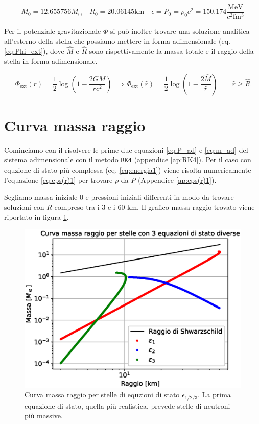 \documentclass[a4paper, titlepage]{article}
\newcommand{\Punit}[0]{\frac{\unit{\mega\electronvolt}}{c^2 \unit{\femto\cubic\meter}}}
\begin{document}
\begin{equation}
    M_0 = 12.655756 M_\odot \quad R_0 = 20.06145 \unit{\kilo\meter} \quad \epsilon = P_0 = \rho_0 c^2 = 150.174 \Punit
    \label{eq:val_cost}
\end{equation}

Per il potenziale gravitazionale $\Phi$ si può inoltre trovare una soluzione analitica all'esterno della stella che possiamo mettere in forma adimensionale (eq. \ref{eq:Phi_ext}), dove $\hat{M}$ e $\hat R$ sono rispettivamente la massa totale e il raggio della stella in forma adimensionale.

\begin{equation}
    \Phi_\text{ext} (r) = \frac{1}{2} \log(1 - \frac{2 G M}{r c^2})
    \implies \Phi_\text{ext} (\hat r) = \frac{1}{2} \log(1 - \frac{2 \hat{M}}{\hat r}) \quad \quad \hat r \geq \hat{R}
    \label{eq:Phi_ext}
\end{equation}


\section{Curva massa raggio}
Cominciamo con il risolvere le prime due equazioni \ref{eq:P_ad} e \ref{eq:m_ad} del sistema adimensionale con il metodo \texttt{RK4} (appendice \ref{ap:RK4}).
Per il caso con equzione di stato più complessa (eq. \ref{eq:energia1}) viene risolta numericamente l'equazione \ref{eq:eps(r)1} per trovare $\rho$ da $P$ (Appendice \ref{ap:eps(r)1}).

Segliamo massa iniziale 0 e pressioni iniziali differenti in modo da trovare soluzioni con $R$ compreso tra i 3 e i 60 \unit{\kilo\meter}. Il grafico massa raggio trovato viene riportato in figura \ref{fig:MR}.

\begin{figure}[h]
        \centering
        \includegraphics[width = 0.6 \textwidth]{Figures/MR.eps}
        \caption{Curva massa raggio per stelle di equzioni di stato $\epsilon_{1/2/3}$. La prima equazione di stato, quella più realistica, prevede stelle di neutroni più massive.}
        \label{fig:MR}
\end{figure}
\end{document}
